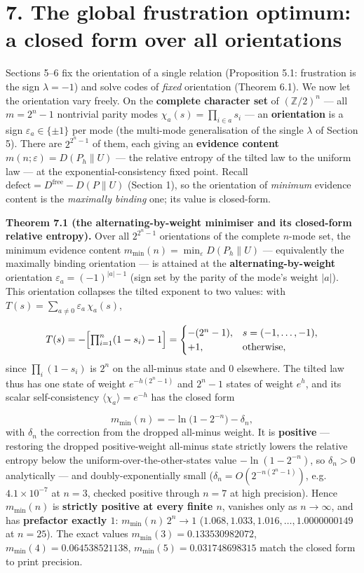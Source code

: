 \documentclass[11pt]{article}
\begin{document}
\section*{7. The global frustration optimum: a closed form over all orientations}
Sections 5–6 fix the orientation of a single relation (Proposition 5.1: frustration is the sign $\lambda = -1$) and solve codes of \emph{fixed} orientation (Theorem 6.1).  We now let the orientation vary freely.  On the \textbf{complete character set} of $(\mathbb Z/2)^n$ — all $m = 2^n - 1$ nontrivial parity modes $\chi_a(s) = \prod_{i\in a} s_i$ — an \textbf{orientation} is a sign $\varepsilon_a \in \{\pm 1\}$ per mode (the multi-mode generalisation of the single $\lambda$ of Section 5).  There are $2^{2^n - 1}$ of them, each giving an \textbf{evidence content} $m(n;\varepsilon) = D(P_h\|U)$ — the relative entropy of the tilted law to the uniform law — at the exponential-consistency fixed point.  Recall $\mathrm{defect} = D^{\mathrm{free}} - D(P\|U)$ (Section 1), so the orientation of \emph{minimum} evidence content is the \emph{maximally binding} one; its value is closed-form.

\textbf{Theorem 7.1 (the alternating-by-weight minimiser and its closed-form relative entropy).}  Over all $2^{2^n-1}$ orientations of the complete $n$-mode set, the minimum evidence content $m_{\min}(n) = \min_\varepsilon D(P_h\|U)$ — equivalently the maximally binding orientation — is attained at the \textbf{alternating-by-weight} orientation $\varepsilon_a = (-1)^{|a|-1}$ (sign set by the parity of the mode's weight $|a|$). This orientation collapses the tilted exponent to two values: with $T(s) = \sum_{a\ne 0}\varepsilon_a\,\chi_a(s)$,

\[
T(s) = -\Bigl[\textstyle\prod_{i=1}^n (1 - s_i) - 1\Bigr]
= \begin{cases} -(2^n - 1), & s = (-1,\dots,-1),\\
+1, & \text{otherwise},\end{cases}
\]
since $\prod_i(1-s_i)$ is $2^n$ on the all-minus state and $0$ elsewhere.  The tilted law thus has one state of weight $e^{-h(2^n-1)}$ and $2^n-1$ states of weight $e^{h}$, and its scalar self-consistency $\langle\chi_a\rangle = e^{-h}$ has the closed form

\[
m_{\min}(n) = -\ln\!\bigl(1 - 2^{-n}\bigr) - \delta_n,
\]
with $\delta_n$ the correction from the dropped all-minus weight. It is \textbf{positive} — restoring the dropped positive-weight all-minus state strictly lowers the relative entropy below the uniform-over-the-other-states value $-\ln(1-2^{-n})$, so $\delta_n > 0$ analytically — and doubly-exponentially small ($\delta_n = O(2^{-n(2^n-1)})$, e.g. $4.1\times10^{-7}$ at $n=3$, checked positive through $n=7$ at high precision).  Hence $m_{\min}(n)$ is \textbf{strictly positive at every finite $n$}, vanishes only as $n\to\infty$, and has \textbf{prefactor exactly $1$}: $m_{\min}(n)\,2^n \to 1$ ($1.068, 1.033, 1.016, \dots, 1.0000000149$ at $n=25$).  The exact values $m_{\min}(3)=0.133530982072$, $m_{\min}(4)=0.064538521138$, $m_{\min}(5)=0.031748698315$ match the closed form to print precision.
\end{document}
